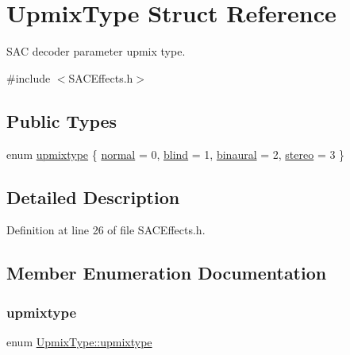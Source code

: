 \hypertarget{struct_upmix_type}{}\section{Upmix\+Type Struct Reference}
\label{struct_upmix_type}


S\+AC decoder parameter upmix type.  




{\ttfamily \#include $<$S\+A\+C\+Effects.\+h$>$}

\subsection*{Public Types}
\begin{DoxyCompactItemize}
\item 
enum \hyperlink{struct_upmix_type_a6e154a570349b46c268b300b13d65daf}{upmixtype} \{ \hyperlink{struct_upmix_type_a6e154a570349b46c268b300b13d65dafa396ec163fe547f88b1907dbba219e522}{normal} = 0, 
\hyperlink{struct_upmix_type_a6e154a570349b46c268b300b13d65dafac19cfeb8f83adfad653eac49b3c42ad6}{blind} = 1, 
\hyperlink{struct_upmix_type_a6e154a570349b46c268b300b13d65dafa91c847f68238d3c40b4d29e07dd47c44}{binaural} = 2, 
\hyperlink{struct_upmix_type_a6e154a570349b46c268b300b13d65dafa43533cc1c81e6c6faa432117de399809}{stereo} = 3
 \}
\end{DoxyCompactItemize}


\subsection{Detailed Description}


Definition at line 26 of file S\+A\+C\+Effects.\+h.



\subsection{Member Enumeration Documentation}
\mbox{\label{struct_upmix_type_a6e154a570349b46c268b300b13d65daf}} 
\subsubsection{\texorpdfstring{upmixtype}{upmixtype}}
{\footnotesize\ttfamily enum \hyperlink{struct_upmix_type_a6e154a570349b46c268b300b13d65daf}{Upmix\+Type\+::upmixtype}}

